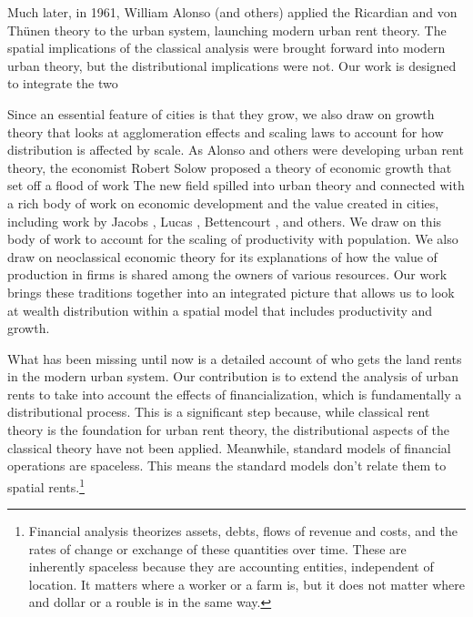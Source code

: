 Much later, in 1961, William Alonso (and others) \cite{alonsoModelUrbanLand1960} applied the Ricardian and von Th\"unen theory to the urban system, launching modern urban rent theory.  The spatial implications of the classical analysis were brought forward into modern urban theory, but the distributional implications were not. Our work is designed to integrate the two

Since an essential feature of cities is that they grow, we also draw on growth theory that looks at agglomeration effects and scaling laws to account for how distribution is affected by scale.  As Alonso and others were developing urban rent theory, the economist Robert Solow \cite{solowContributionTheoryEconomic1956} proposed a theory of economic growth that set off a flood of work The new field spilled into urban theory and connected with a rich body of work on economic development and the value created in cities, including work by Jacobs \cite{jacobsEconomyCities1969}, Lucas \cite{lucasMechanicsEconomicDevelopment1988}, Bettencourt \cite{bettencourtGrowthInnovationScaling2007}, and others. We draw on this body of work to account for the scaling of productivity with population. We also draw on neoclassical economic theory for its explanations of how the value of production in firms is shared among the owners of various resources. Our work brings these traditions together into an integrated picture that allows us to look at wealth distribution within a spatial model that includes productivity and growth.  

 What has been missing until now is a detailed account of who gets the land rents in the modern urban system. Our contribution is to extend the analysis of urban rents to take into account the effects of financialization, which is fundamentally a distributional process. This is a significant step because, while classical rent theory is the foundation for urban rent theory, the distributional aspects of the classical theory have not been applied. Meanwhile, standard models of financial operations are spaceless. This means the standard models don't relate them to spatial rents.\footnote{%
 Financial analysis theorizes assets, debts, flows of revenue and costs, and the rates of change or exchange of these quantities over time. These are inherently spaceless because they are accounting entities, independent of location. It matters where a worker or a farm is, but it does not matter where and dollar or a rouble is in the same way.} 
 

